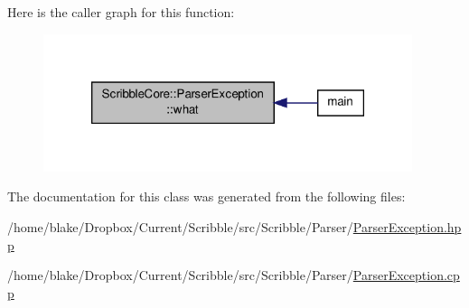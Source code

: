 Here is the caller graph for this function\-:
\nopagebreak
\begin{figure}[H]
\begin{center}
\leavevmode
\includegraphics[width=306pt]{class_scribble_core_1_1_parser_exception_ad4ba27faad1057694ca0e3d732a1f66e_icgraph}
\end{center}
\end{figure}




The documentation for this class was generated from the following files\-:\begin{DoxyCompactItemize}
\item 
/home/blake/\-Dropbox/\-Current/\-Scribble/src/\-Scribble/\-Parser/\hyperlink{_parser_exception_8hpp}{Parser\-Exception.\-hpp}\item 
/home/blake/\-Dropbox/\-Current/\-Scribble/src/\-Scribble/\-Parser/\hyperlink{_parser_exception_8cpp}{Parser\-Exception.\-cpp}\end{DoxyCompactItemize}

